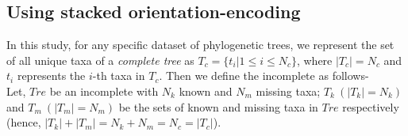 
\subsection{Using stacked orientation-encoding}
In this study, for any specific dataset of phylogenetic trees, we represent the set of all unique taxa of a \textit{complete tree} as $T_c=\{t_i|1 \leq i \leq N_c\}$, where $|T_c|=N_c$ and $t_i$ represents the $i$-th taxa in $T_c$. 
Then we define the incomplete  as follows-\\
Let, $Tre$ be an incomplete  with $N_k$ known and $N_m$ missing taxa; $T_k~(|T_k|=N_k)$ and $T_m~(|T_m|=N_m)$ be the sets of known and missing taxa in $Tre$ respectively (hence, $|T_k|+|T_m|=N_k+N_m=N_c=|T_c|$). 



